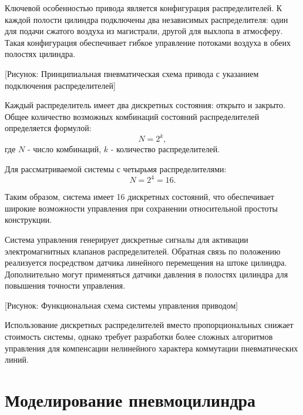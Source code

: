 Ключевой особенностью привода является конфигурация распределителей.
К каждой полости цилиндра подключены два независимых распределителя:
один для подачи сжатого воздуха из магистрали, другой для выхлопа в атмосферу.
Такая конфигурация обеспечивает гибкое управление потоками воздуха в обеих полостях цилиндра.

[Рисунок: Принципиальная пневматическая схема привода с указанием подключения распределителей]

Каждый распределитель имеет два дискретных состояния: открыто и закрыто.
Общее количество возможных комбинаций состояний распределителей
определяется формулой:
\begin{equation*}
    N = 2^k,
\end{equation*}
где $N$ - число комбинаций, $k$ - количество распределителей.

Для рассматриваемой системы с четырьмя распределителями:
\begin{equation*}
    N = 2^4 = 16.
\end{equation*}

Таким образом, система имеет 16 дискретных состояний, что обеспечивает широкие возможности
управления при сохранении относительной простоты конструкции.

Система управления генерирует дискретные сигналы для активации
электромагнитных клапанов распределителей. Обратная связь по положению реализуется посредством датчика линейного перемещения на штоке цилиндра. Дополнительно могут применяться датчики давления в полостях цилиндра для повышения точности управления.

[Рисунок: Функциональная схема системы управления приводом]

Использование дискретных распределителей вместо пропорциональных
снижает стоимость системы, однако требует разработки более сложных
алгоритмов управления для компенсации нелинейного характера коммутации пневматических линий.

\section{Моделирование пневмоцилиндра}\label{sec:ch2/sec2}

